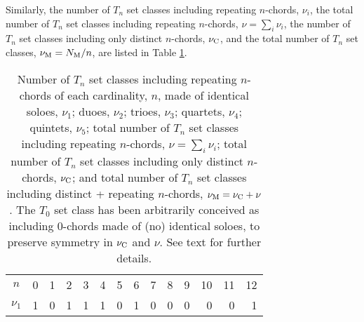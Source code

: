 \documentclass[12pt,a4paper]{article}
\begin{document}
Similarly, the number of $T_n$ set classes including repeating $n$-chords,
$\nu_i$, the total number of $T_n$ set classes including repeating $n$-chords,
$\nu=\sum_i\nu_i$, the number of $T_n$ set classes including only distinct
$n$-chords, $\nu_{\rm C}$, and the total number of $T_n$ set classes,
$\nu_{\rm M}=N_{\rm M}/n$, are listed in Table \ref{t:repn}.
%
\begin{table}
\caption{Number of $T_n$ set classes including repeating $n$-chords of each
cardinality, $n$, made of
identical soloes, $\nu_1$; duoes, $\nu_2$; trioes,
$\nu_3$; quartets, $\nu_4$; quintets, $\nu_5$; total number of $T_n$ set
classes including repeating $n$-chords, $\nu=\sum_i\nu_i$; total number of
$T_n$ set classes including only distinct $n$-chords, $\nu_{\rm C}$; and total
number of $T_n$ set classes including distinct + repeating $n$-chords,
$\nu_{\rm M}=\nu_{\rm C}+\nu$.   The $T_0$ set class has been arbitrarily
conceived as including $0$-chords made of (no) identical soloes, to
preserve symmetry in $\nu_{\rm C}$ and $\nu$.   See text for further details.}
\label{t:repn}
\begin{center}
\begin{tabular}{|c|r|r|r|r|r|r|r|r|r|r|r|r|r|} \hline
\hline
$n$                   & \phantom{$$}0          & 1 &  2                  &  3                  &   4                  &   5 &   6 &   7 &   8                  &   9                 & 10                  & 11 & 12                     \\
$\nu_1$               & \phantom{$$}1          & 0 &  1                  &  1                  &   1                  &   0 &   1 &   0 &   0                  &   0                 &  0                  &  0 &  1                     \\

\end{tabular}
\end{center}
\end{table}
\end{document}
